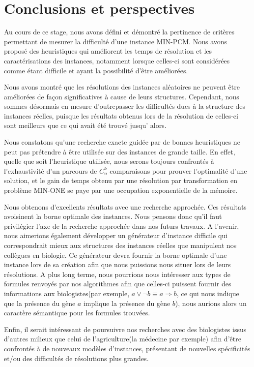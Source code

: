 \section{Conclusions et perspectives} 
Au cours de ce stage, nous avons défini  et démontré la pertinence de critères permettant de mesurer la difficulté d'une instance MIN-PCM. Nous avons proposé des heuristiques qui améliorent les temps de résolution et les caractérisations des instances, notamment lorsque celles-ci sont considérées comme étant difficile et ayant la possibilité d'être améliorées. 

Nous avons montré que les résolutions des instances aléatoires ne peuvent être améliorées de façon significatives à cause de leurs structures. Cependant, nous sommes désormais en mesure d'outrepasser les difficultés dues à la structure des instances réelles, puisque les résultats obtenus lors de la résolution de celles-ci sont meilleurs que ce qui avait été trouvé jusqu' alors. 

Nous constatons qu'une recherche exacte guidée par de bonnes heuristiques ne peut pas prétendre à être utilisée sur des instances de grande taille. En effet, quelle que soit l'heuristique utilisée, nous serons toujours confrontés à l'exhaustivité d'un parcours de $C_n^k$ comparaisons pour prouver l'optimalité d'une solution, et le gain de temps obtenu par une résolution par transformation en problème MIN-ONE se paye par une occupation exponentielle de la mémoire. 

Nous obtenons d'excellents résultats avec une recherche approchée. Ces résultats avoisinent la borne optimale des instances. Nous pensons donc qu'il faut privilégier l'axe de la recherche approchée dans nos futurs travaux. A l'avenir, nous aimerions également développer un générateur d'instance difficile qui correspondrait mieux aux structures des instances réelles que manipulent nos collègues en biologie. Ce générateur devra fournir la borne optimale d'une instance lors de sa création afin que nous puissions nous situer lors de leurs résolutions. A plus long terme, nous pourrions nous intéresser aux types de formules renvoyés par nos algorithmes afin que celles-ci puissent fournir des informations aux biologistes(par exemple, $a \lor \lnot b \equiv a \Rightarrow b$, ce qui nous indique que la présence du gène $a$ implique la présence du gène $b$), nous aurions alors un caractère sémantique pour les formules trouvées. 

Enfin, il serait intéressant de poursuivre nos recherches avec des biologistes issus d'autres milieux que celui de l'agriculture(la médecine par exemple) afin d'être confrontés à de nouveaux modèles d'instances, présentant de nouvelles spécificités et/ou des difficultés de résolutions plus grandes.



